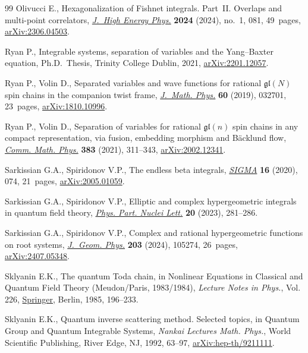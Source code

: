 \documentclass[pdftex]{sigma}
\numberwithin{equation}{section}
\begin{document}
\begin{thebibliography}{99}
Olivucci E., Hexagonalization of {F}ishnet integrals. {P}art~{II}. {O}verlaps
 and multi-point correlators,
 \href{https://doi.org/10.1007/jhep01(2024)081}{\textit{J.~High Energy Phys.}}
 \textbf{2024} (2024), no.~1, 081, 49~pages,
 \href{http://arxiv.org/abs/2306.04503}{arXiv:2306.04503}.

Ryan P., Integrable systems, separation of variables and the {Y}ang--{B}axter
 equation, Ph.D.~Thesis, {T}rinity College Dublin, 2021,
 \href{http://arxiv.org/abs/2201.12057}{arXiv:2201.12057}.

Ryan P., Volin D., Separated variables and wave functions for rational
 {$\mathfrak{gl}(N)$} spin chains in the companion twist frame,
 \href{https://doi.org/10.1063/1.5085387}{\textit{J.~Math. Phys.}} \textbf{60}
 (2019), 032701, 23~pages,
 \href{http://arxiv.org/abs/1810.10996}{arXiv:1810.10996}.

Ryan P., Volin D., Separation of variables for rational {$\mathfrak{gl}(n)$}
 spin chains in any compact representation, via fusion, embedding morphism and
 {B}\"acklund flow,
 \href{https://doi.org/10.1007/s00220-021-03990-7}{\textit{Comm. Math. Phys.}}
 \textbf{383} (2021), 311--343,
 \href{http://arxiv.org/abs/2002.12341}{arXiv:2002.12341}.

Sarkissian G.A., Spiridonov V.P., The endless beta integrals,
 \href{https://doi.org/10.3842/SIGMA.2020.074}{\textit{SIGMA}} \textbf{16}
 (2020), 074, 21~pages,
 \href{http://arxiv.org/abs/2005.01059}{arXiv:2005.01059}.

Sarkissian G.A., Spiridonov V.P., Elliptic and complex hypergeometric integrals
 in quantum field theory,
 \href{https://doi.org/10.1134/S1547477123030603}{\textit{Phys. Part. Nuclei
 Lett.}} \textbf{20} (2023), 281--286.

Sarkissian G.A., Spiridonov V.P., Complex and rational hypergeometric functions
 on root systems,
 \href{https://doi.org/10.1016/j.geomphys.2024.105274}{\textit{J.~Geom.
 Phys.}} \textbf{203} (2024), 105274, 26~pages,
 \href{http://arxiv.org/abs/2407.05348}{arXiv:2407.05348}.

Sklyanin E.K., The quantum {T}oda chain, in Nonlinear Equations in Classical
 and Quantum Field Theory ({M}eudon/{P}aris, 1983/1984), \textit{Lecture Notes
 in Phys.}, Vol. 226,
 \href{https://doi.org/10.1007/3-540-15213-X_80}{Springer}, Berlin, 1985,
 196--233.

Sklyanin E.K., Quantum inverse scattering method. {S}elected topics, in Quantum
 Group and Quantum Integrable Systems, \textit{Nankai Lectures Math. Phys.}, World
 Scientific Publishing, River Edge, NJ, 1992, 63--97,
 \href{http://arxiv.org/abs/hep-th/9211111}{arXiv:hep-th/9211111}.


\end{thebibliography}
\end{document}
